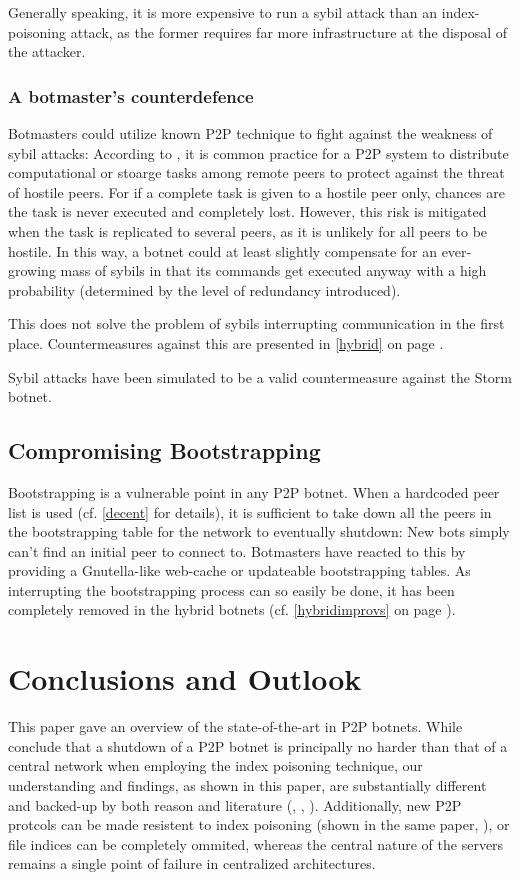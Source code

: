 \documentclass{llncs}
\begin{document}
Generally speaking, it is more expensive to run a sybil attack than an
index-poisoning attack, as the former requires far more infrastructure
at the disposal of the attacker.

\subsubsection{A botmaster's counterdefence}
Botmasters could utilize known P2P technique to fight against the
weakness of sybil attacks: According to \cite{douceur2002sybil}, it is
common practice for a P2P system to distribute computational or
stoarge tasks among remote peers to protect against the threat of
hostile peers. For if a complete task is given to a hostile peer only,
chances are the task is never executed and completely lost. However,
this risk is mitigated when the task is replicated to several peers,
as it is unlikely for all peers to be hostile. In this way, a botnet
could at least slightly compensate for an ever-growing mass of sybils
in that its commands get executed anyway with a high probability
(determined by the level of redundancy introduced).

This does not solve the problem of sybils interrupting communication
in the first place. Countermeasures against this are presented in
\ref{hybrid} on page \pageref{hybrid}.

Sybil attacks have been simulated to be a valid countermeasure against
the Storm botnet.\cite{davis2008sybil}

\subsection{Compromising Bootstrapping}
Bootstrapping is a vulnerable point in any P2P botnet. When a
hardcoded peer list is used (cf. \ref{decent} for details), it is
sufficient to take down all the peers in the bootstrapping table for
the network to eventually shutdown: New bots simply can't find an
initial peer to connect to. Botmasters have reacted to this by
providing a Gnutella-like web-cache or updateable bootstrapping
tables. As interrupting the bootstrapping process can so easily be
done, it has been completely removed in the hybrid botnets
(cf. \ref{hybridimprovs} on page \pageref{hybridimprovs}).

\section{Conclusions and Outlook}
This paper gave an overview of the state-of-the-art in P2P
botnets. While \cite{wang2009systematic} conclude that a shutdown of a
P2P botnet is principally no harder than that of a central network
when employing the index poisoning technique, our understanding and
findings, as shown in this paper, are substantially different and
backed-up by both reason and literature (\cite{zou2006honeypot},
\cite{berger2009exploiting},
\cite{steggink2007detection}). Additionally, new P2P protcols can be
made resistent to index poisoning (shown in the same paper,
\cite{wang2009systematic}), or file indices can be completely ommited,
whereas the central nature of the servers remains a single point of
failure in centralized architectures.
\end{document}
